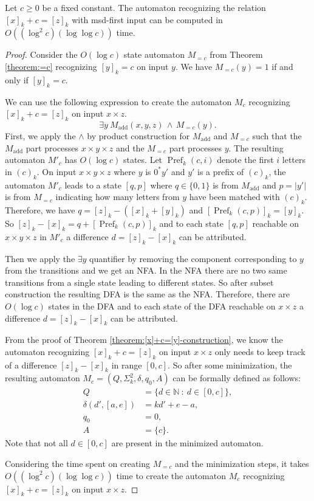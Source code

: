\documentclass[12pt,reqno]{article}
\def\AND{\, \wedge \,}
\def\suchthat{\ : \ }
\def\add{\text{add}}
\DeclareMathOperator{\pre}{Pref}
\begin{document}
\begin{theorem} \label{theorem:[x]+c=[z]-time}
    Let $c \geq 0$ be a fixed constant. The automaton recognizing the relation $[x]_k + c =[z]_k$ with msd-first input can be computed in $O((\log^2 c) (\log\log c))$ time.
\end{theorem}

\begin{proof}
    Consider the $O(\log c)$ state automaton $M_{=c}$ from Theorem \ref{theorem:=c} recognizing $[y]_k = c$ on input $y$. We have $M_{=c}(y)=1$ if and only if $[y]_k=c$. 
    
    We can use the following expression to create the automaton $M_c$ recognizing $[x]_k + c=[z]_k$ on input $x \times z$.
    \[
    \exists y \ M_{\add}(x, y, z) \AND M_{=c}(y).
    \]
    First, we apply the $\land$ by product construction for $M_{\add}$ and $M_{=c}$ such that the $M_{\add}$ part processes $x\times y \times z$ and the $M_{=c}$ part processes $y$. The resulting automaton $M'_c$ has $O(\log c)$ states.
     Let $\pre_k(c, i)$ denote the first $i$ letters in $(c)_k$. On input $x\times y \times z$ where $y$ is $0^*y'$ and $y'$ is a prefix of $(c)_k$, the automaton $M'_c$ leads to a state $[q, p]$ where $q\in \{0, 1\}$ is from $M_{\add}$ and $p=|y'|$ is from $M_{=c}$ indicating how many letters from $y$ have been matched with $(c)_k$. Therefore, we have $q=[z]_k-([x]_k + [y]_k)$ and $[\pre_k(c, p)]_k = [y]_k$. So $[z]_k - [x]_k = q + [\pre_k(c, p)]_k$ and to each state $[q, p]$ reachable on $x \times y \times z$ in $M'_c$ a difference $d = [z]_k - [x]_k$ can be attributed. 
    
    Then we apply the $\exists y$ quantifier by removing the component corresponding to $y$ from the transitions and we get an NFA. In the NFA there are no two same transitions from a single state leading to different states. So after subset construction the resulting DFA is the same as the NFA. Therefore, there are $O(\log c)$ states in the DFA and to each state of the DFA reachable on $x\times z$ a difference $d=[z]_k-[x]_k$ can be attributed.

    From the proof of Theorem \ref{theorem:[x]+c=[y]-construction}, we know the automaton recognizing $[x]_k + c= [z]_k$ on input $x \times z$ only needs to keep track of a difference $[z]_k - [x]_k$ in range $[0, c]$. So after some minimization, the resulting automaton $M_c=(Q, \Sigma^2_k, \delta, q_0, A)$ can be formally defined as follows:
    \begin{align*}
        Q &= \{d \in \mathbb{N} \suchthat d \in [0, c]\}, \\
        \delta(d', [a, e]) &= kd' + e -a, \\
        q_0 &= 0, \\
        A &= \{c\}.
    \end{align*}
    Note that not all $d \in [0, c]$ are present in the minimized automaton.
    
    Considering the time spent on creating $M_{=c}$ and the minimization steps, it takes $O((\log^2 c) (\log\log c))$ time to create the automaton $M_c$ recognizing $[x]_k + c = [z]_k$ on input $x \times z$. 
\end{proof}
\end{document}
